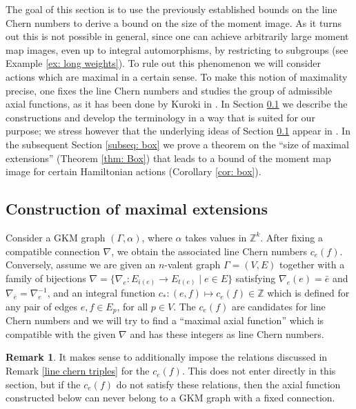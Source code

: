 \documentclass[12pt,a4paper]{amsart}
\newcommand{\ZZ}{\mathbb{Z}}
\theoremstyle{plain}
\theoremstyle{definition}
\newtheorem{rem}[thm]{Remark}
\begin{document}
The goal of this section is to use the previously established bounds on the line Chern
numbers to derive a bound on the size of the moment image. As it turns out this is not
possible in general, since one can achieve arbitrarily large moment map images, even up to
integral automorphisms, by restricting to subgroups (see Example \ref{ex: long weights}).
To rule out this phenomenon we will consider actions which are maximal in a certain sense.
To make this notion of maximality precise, one fixes the line Chern numbers and studies
the group of admissible axial functions, as it has been done by Kuroki in \cite{MR3943448}. In Section
\ref{subsec: max extensions} we describe the constructions and develop the terminology in
a way that is suited for our purpose; we stress however that the underlying ideas of
Section \ref{subsec: max extensions} appear in \cite{MR3943448}. In the subsequent Section \ref{subseq: box} we prove a theorem on the ``size of maximal extensions'' (Theorem \ref{thm: Box}) that leads to a bound of the moment map image for certain Hamiltonian actions (Corollary \ref{cor: box}).


\subsection{Construction of maximal extensions}\label{subsec: max extensions}

Consider a GKM graph $(\Gamma,\alpha)$, where $\alpha$ takes values in $\ZZ^k$. After
fixing a compatible connection $\nabla$, we obtain the associated line Chern numbers
$c_e(f)$. Conversely, assume we are given an $n$-valent graph $\Gamma=(V,E)$ together with
a family of bijections $\nabla=\{\nabla_e\colon E_{i(e)} \to E_{t(e)}\mid e\in E\}$
satisfying $\nabla_e(e)=\bar{e}$ and
$\nabla_{\overline{e}}=\nabla_e^{-1}$, and an integral function $c_*\colon (e,f)\mapsto
c_e(f)\in \ZZ$ which is defined for any pair of edges $e,f\in E_p$, for all $p\in V$.
The $c_e(f)$ are candidates for line Chern numbers and we will try to find a ``maximal axial function'' which is compatible
with the given $\nabla$ and has these integers as line Chern numbers.
\begin{rem}
 It makes sense to additionally impose the relations discussed in Remark \ref{line chern triples} for the $c_e(f)$. This does not enter directly in this section, but if the $c_e(f)$ do not satisfy these relations, then the axial function constructed below can never belong to a GKM graph with a fixed connection. 
\end{rem}
\end{document}
